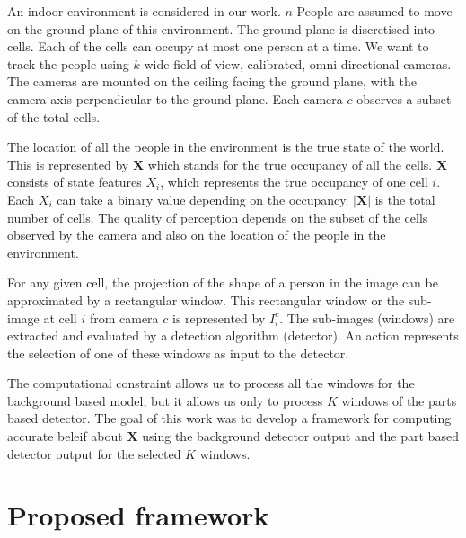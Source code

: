 \documentclass[10pt,twocolumn,letterpaper]{article}
\begin{document}
An indoor environment is considered in our work. $ n$ People are assumed to move on the ground plane of this environment. The ground plane is discretised into cells. Each of the cells can occupy at most one person at a time. We want to track the people using $ k $ wide field of view, calibrated, omni directional cameras. The cameras are mounted on the ceiling facing the ground plane, with the camera axis perpendicular to the ground plane. Each camera $ c $ observes a subset of the total cells.

The location of all the people in the environment is the true state of the world. This is represented by  \textbf{X} which stands for the true occupancy of all the cells. \textbf{X} consists of state features $X_{i}$, which represents the true occupancy of one cell $ i$. Each $X_{i}$ can take a binary value depending on the occupancy. $|\textbf{X}| $ is the total number of cells. The quality of perception depends on the subset of the cells observed by the camera and also on the location of the people in the environment.

For any given cell, the projection of the shape of a person in the image can be approximated by a rectangular window. This rectangular window or the sub-image at cell $ i $ from camera $ c$ is represented by $ I^{c}_{i} $. The sub-images (windows) are extracted and evaluated by a detection algorithm (detector). An action represents the selection of one of these windows as input to the detector.

The computational constraint allows us to process all the windows for the background based model, but it allows us only to process $ K $ windows of the parts based detector. The goal of this work was to develop a framework for computing accurate beleif about $\textbf{X}$ using the background detector output and the part based detector output for the selected $K$ windows.

\section{Proposed framework}
\end{document}
